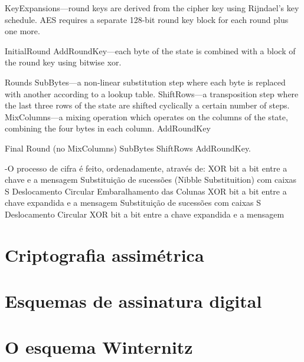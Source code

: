 \documentclass{article}
\begin{document}
\begin{itemize}
KeyExpansions—round keys are derived from the cipher key using Rijndael's key schedule. AES requires a separate 128-bit round key block for each round plus one more.

InitialRound
AddRoundKey—each byte of the state is combined with a block of the round key using bitwise xor.

Rounds
SubBytes—a non-linear substitution step where each byte is replaced with another according to a lookup table.
ShiftRows—a transposition step where the last three rows of the state are shifted cyclically a certain number of steps.
MixColumns—a mixing operation which operates on the columns of the state, combining the four bytes in each column.
AddRoundKey

Final Round (no MixColumns)
SubBytes
ShiftRows
AddRoundKey.

\end{itemize}
-O processo de cifra é feito, ordenadamente, através de: 
XOR bit a bit entre a chave e a mensagem
Substituição de sucessões (Nibble Substituition) com caixas S
Deslocamento Circular
Embaralhamento das Colunas
XOR bit a bit entre a chave expandida e a mensagem
Substituição de sucessões com caixas S
Deslocamento Circular
XOR bit a bit entre a chave expandida e a mensagem


\section*{Criptografia assimétrica}

\section*{Esquemas de assinatura digital}

\section*{O esquema Winternitz}


 
\end{document}
